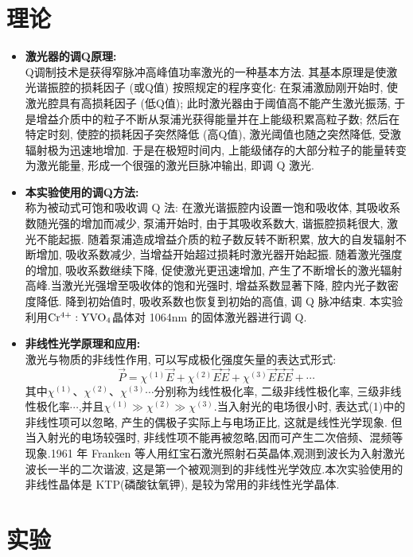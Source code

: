 \documentclass[a4paper]{article}
\begin{document}
\section{理论} \label{theory}%
\begin{itemize}
\item{\textbf{激光器的调Q原理:}\\
Q调制技术是获得窄脉冲高峰值功率激光的一种基本方法. 其基本原理是使激光谐振腔的损耗因子 (或Q值) 按照规定的程序变化: 在泵浦激励刚开始时, 使激光腔具有高损耗因子 (低Q值); 此时激光器由于阈值高不能产生激光振荡, 于是增益介质中的粒子不断从泵浦光获得能量并在上能级积累高粒子数; 然后在特定时刻, 使腔的损耗因子突然降低 (高Q值), 激光阈值也随之突然降低, 受激辐射极为迅速地增加. 于是在极短时间内, 上能级储存的大部分粒子的能量转变为激光能量, 形成一个很强的激光巨脉冲输出, 即调 Q 激光.}
\item{\textbf{本实验使用的调Q方法:}\\
称为被动式可饱和吸收调 Q 法: 在激光谐振腔内设置一饱和吸收体, 其吸收系数随光强的增加而减少, 泵浦开始时, 由于其吸收系数大, 谐振腔损耗很大, 激光不能起振. 随着泵浦造成增益介质的粒子数反转不断积累, 放大的自发辐射不断增加, 吸收系数减少, 当增益开始超过损耗时激光器开始起振. 随着激光强度的增加, 吸收系数继续下降, 促使激光更迅速增加, 产生了不断增长的激光辐射高峰.当激光光强增至吸收体的饱和光强时, 增益系数显著下降, 腔内光子数密度降低. 降到初始值时, 吸收系数也恢复到初始的高值, 调 Q 脉冲结束. 本实验利用$\rm Cr^{4+}:YVO_4$晶体对 1064nm 的固体激光器进行调 Q.}
\item{\textbf{非线性光学原理和应用:}\\
激光与物质的非线性作用, 可以写成极化强度矢量的表达式形式:
\begin{equation}
\vec{P}=\chi^{(1)}\vec{E}+\chi^{(2)}\vec{E}\vec{E}+\chi^{(3)}\vec{E}\vec{E}\vec{E}+\cdots
\end{equation}
其中$\chi^{(1)}、\chi^{(2)}、\chi^{(3)}\cdots$分别称为线性极化率, 二级非线性极化率, 三级非线性极化率$\cdots$,并且$\chi^{(1)}\gg\chi^{(2)}\gg\chi^{(3)}$.当入射光的电场很小时, 表达式(1)中的非线性项可以忽略, 产生的偶极子实际上与电场正比, 这就是线性光学现象. 但当入射光的电场较强时, 非线性项不能再被忽略,因而可产生二次倍频、混频等现象.1961 年 Franken 等人用红宝石激光照射石英晶体,观测到波长为入射激光波长一半的二次谐波, 这是第一个被观测到的非线性光学效应.本次实验使用的非线性晶体是 KTP(磷酸钛氧钾), 是较为常用的非线性光学晶体.
}
\end{itemize}
\newpage
\section{实验} \label{experiment}%
\end{document}
